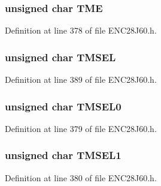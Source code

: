 \hypertarget{union___r_e_g_a321d6233960463d393dc8c22b24cc01e}{}
\subsubsection[{T\+M\+E}]{\setlength{\rightskip}{0pt plus 5cm}unsigned {\bf char} T\+M\+E}\label{union___r_e_g_a321d6233960463d393dc8c22b24cc01e}


Definition at line 378 of file E\+N\+C28\+J60.\+h.

\hypertarget{union___r_e_g_a2ca3c5f05678be586fa78dfcf0be1b56}{}
\subsubsection[{T\+M\+S\+E\+L}]{\setlength{\rightskip}{0pt plus 5cm}unsigned {\bf char} T\+M\+S\+E\+L}\label{union___r_e_g_a2ca3c5f05678be586fa78dfcf0be1b56}


Definition at line 389 of file E\+N\+C28\+J60.\+h.

\hypertarget{union___r_e_g_a9cc7dd99e6c64dc8eb9e714d6deb20fd}{}
\subsubsection[{T\+M\+S\+E\+L0}]{\setlength{\rightskip}{0pt plus 5cm}unsigned {\bf char} T\+M\+S\+E\+L0}\label{union___r_e_g_a9cc7dd99e6c64dc8eb9e714d6deb20fd}


Definition at line 379 of file E\+N\+C28\+J60.\+h.

\hypertarget{union___r_e_g_a20ad334d45184f66abda8aa8f9c5785e}{}
\subsubsection[{T\+M\+S\+E\+L1}]{\setlength{\rightskip}{0pt plus 5cm}unsigned {\bf char} T\+M\+S\+E\+L1}\label{union___r_e_g_a20ad334d45184f66abda8aa8f9c5785e}


Definition at line 380 of file E\+N\+C28\+J60.\+h.

